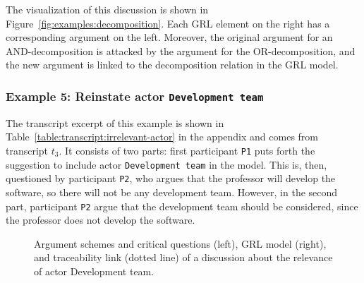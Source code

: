 The visualization of this discussion is shown in Figure~\ref{fig:examples:decomposition}. Each GRL element on the right has a corresponding argument on the left. Moreover, the original argument for an AND-decomposition is attacked by the argument for the OR-decomposition, and the new argument is linked to the decomposition relation in the GRL model. %

\subsubsection{Example 5: Reinstate actor \texttt{Development team}}

The transcript excerpt of this example is shown in Table~\ref{table:transcript:irrelevant-actor} in the appendix and comes from transcript $t_3$. It consists of two parts: first participant \texttt{P1} puts forth the suggestion to include actor \texttt{Development team} in the model. This is, then, questioned by participant \texttt{P2}, who argues that the professor will develop the software, so there will not be any development team. However, in the second part, participant \texttt{P2} argue that the development team should be considered, since the professor does not develop the software.

\begin{figure}[ht!]
\centering
\caption{Argument schemes and critical questions (left), GRL model (right), and traceability link (dotted line) of a discussion about the relevance of actor Development team.}
\label{fig:examples:relevant-actor}
\end{figure}

